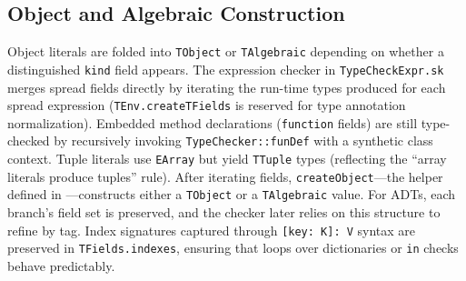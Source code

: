 \documentclass[11pt]{article}
\newcommand{\code}[1]{\path{#1}}
\begin{document}
\subsection{Object and Algebraic Construction}
Object literals are folded into \texttt{TObject} or \texttt{TAlgebraic} depending on whether a distinguished \texttt{kind} field appears. The expression checker in \texttt{TypeCheckExpr.sk} merges spread fields directly by iterating the run-time types produced for each spread expression (\texttt{TEnv.createTFields} is reserved for type annotation normalization). Embedded method declarations (\texttt{function} fields) are still type-checked by recursively invoking \texttt{TypeChecker::funDef} with a synthetic class context. Tuple literals use \texttt{EArray} but yield \texttt{TTuple} types (reflecting the ``array literals produce tuples'' rule).
After iterating fields, \texttt{createObject}—the helper defined in \code{src/TType.sk}—constructs either a \texttt{TObject} or a \texttt{TAlgebraic} value. For ADTs, each branch's field set is preserved, and the checker later relies on this structure to refine by tag. Index signatures captured through \texttt{[key: K]: V} syntax are preserved in \texttt{TFields.indexes}, ensuring that loops over dictionaries or \texttt{in} checks behave predictably.
\end{document}
